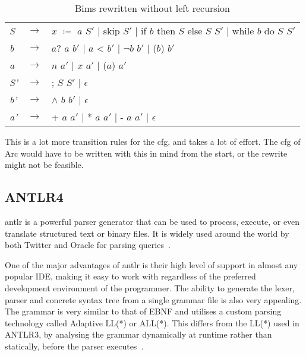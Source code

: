 \begin{table}[htb!]
  \centering
  \begin{tabular}{lll}
    \textit{S}  & $\to$ & $x$ $\coloneqq$ $a$ $S'$
    $\mid$  skip $S'$
    $\mid$  if $b$ then $S$ else $S$ $S'$
    $\mid$  while $b$ do $S$ $S'$                             \\
    \textit{b}  & $\to$ & $a?$ $a$ $b'$
    $\mid$  $a$ < $b'$
    $\mid$  $\neg b$ $b'$
    $\mid$  ($b$) $b'$                                        \\
    \textit{a}  & $\to$ & $n$ $a'$
    $\mid$  $x$ $a'$
    $\mid$  ($a$) $a'$                                        \\
    \textit{S'} & $\to$ & ; $S$ $S'$
    $\mid$  $\epsilon$                                        \\
    \textit{b'} & $\to$ & $\land$ $b$ $b'$ $\mid$  $\epsilon$ \\
    \textit{a'} & $\to$ & + $a$ $a'$
    $\mid$  * $a$ $a'$
    $\mid$  - $a$ $a'$
    $\mid$  $\epsilon$                                        \\
  \end{tabular}
  \caption{Bims rewritten without left recursion}
  \label{tab:bimsrewrite}
\end{table}


This is a lot more transition rules for the \gls{cfg}, and takes a lot of effort. The \gls{cfg} of Arc would have to be written with this in mind from the start, or the rewrite might not be feasible.

\subsection{ANTLR4}
\gls{antlr} is a powerful parser generator that can be used to process, execute, or even translate structured text or binary files. It is widely used around the world by both Twitter and Oracle for parsing queries~\cite{ANTLR_About}.

One of the major advantages of \gls{antlr} is their high level of support in almost any popular IDE, making it easy to work with regardless of the preferred development environment of the programmer. The ability to generate the lexer, parser and concrete syntax tree from a single grammar file is also very appealing. The grammar is very similar to that of EBNF and utilises a custom parsing technology called Adaptive LL(*) or ALL(*). This differs from the LL(*) used in ANTLR3, by analysing the grammar dynamically at runtime rather than statically, before the parser executes~\cite{Parr2014}.

